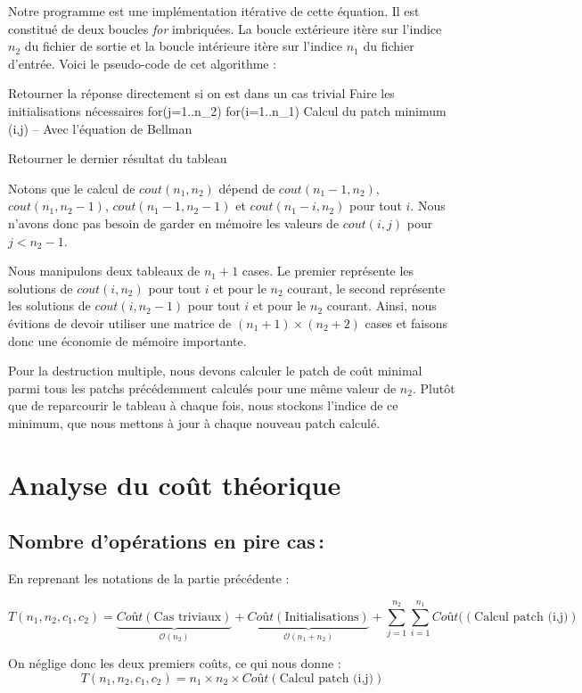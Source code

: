 \documentclass[a4paper, 10pt, french]{article}
\newcommand{\cplx}[1]{\mathcal O \left( #1 \right)}
\begin{document}
Notre programme est une implémentation itérative de cette équation. Il est constitué
de deux boucles \emph{for} imbriquées. La boucle extérieure itère sur l'indice $n_2$
du fichier de sortie et la boucle intérieure itère sur l'indice $n_1$ du fichier
d'entrée.
Voici le pseudo-code de cet algorithme :
\begin{verbatimtab}
	Retourner la réponse directement si on est dans un cas trivial
	Faire les initialisations nécessaires
	for(j=1..n_2)
	  for(i=1..n_1)
		Calcul du patch minimum (i,j) -- Avec l'équation de Bellman

	Retourner le dernier résultat du tableau
\end{verbatimtab}
Notons que le calcul de $cout(n_1, n_2)$ dépend de $cout(n_1-1, n_2)$,
$cout(n_1, n_2-1)$, $cout(n_1-1, n_2-1)$ et $cout(n_1-i, n_2)$ pour tout $i$.
Nous n'avons donc pas besoin de garder en mémoire les valeurs de $cout(i, j)$ pour
$j < n_2-1$.

Nous manipulons deux tableaux de $n_1+1$ cases. Le premier représente les solutions
de $cout(i, n_2)$ pour tout $i$ et pour le $n_2$ courant, le second représente
les solutions de $cout(i, n_2-1)$ pour tout $i$ et pour le $n_2$ courant.
Ainsi, nous évitions de devoir utiliser une matrice de $(n_1+1)\times(n_2+2)$ cases
et faisons donc une économie de mémoire importante.

Pour la destruction multiple, nous devons calculer le patch de coût minimal parmi
tous les patchs précédemment calculés pour une même valeur de $n_2$.
Plutôt que de reparcourir le tableau à chaque fois, nous stockons l'indice de
ce minimum, que nous mettons à jour à chaque nouveau patch calculé.

\section{Analyse du coût théorique}

  \subsection{Nombre  d'opérations en pire cas\,:}
    En reprenant les notations de la partie précédente :

    \[T(n_1,n_2,c_1,c_2) = \underbrace{Coût(\text{Cas triviaux})}_{\cplx{n_2}} +
    \underbrace{Coût(\text{Initialisations})}_{\cplx{n_1+n_2}} +
    \sum_{j=1}^{n_2} \sum_{i=1}^{n_1} Coût((\text{Calcul patch (i,j)})\]

	On néglige donc les deux premiers coûts, ce qui nous donne :
	\[T(n_1,n_2,c_1,c_2) = n_1 \times n_2 \times Coût(\text{Calcul patch (i,j)})\]
\end{document}
